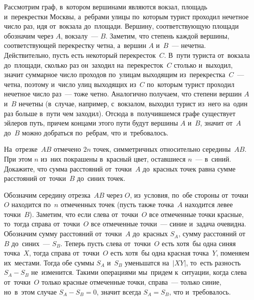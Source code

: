 \ifincludesolutions
Рассмотрим граф, в~котором вершинами являются вокзал, площадь
и~перекрестки Москвы, а~ребрами улицы по~которым турист проходил нечетное число
раз, идя от~вокзала до~площади.
Вершину, соответствующую площади обозначим через $A$, вокзалу~--- $B$.
Заметим, что степень каждой вершины, соответствующей перекрестку четна,
а~вершин $A$ и~$B$~--- нечетна.
Действительно, пусть есть некоторый перекресток~$C$.
В~пути туриста от~вокзала до~площади, сколько раз он~заходил на~перекресток~$C$
столько и~выходил, значит суммарное число проходов по~улицам выходящим
из~перекрестка~$C$~--- четна, поэтому и~число улиц выходящих из~$C$ по~которым
турист проходил нечетное число раз~--- тоже четно.
Аналогично получаем, что степени вершин $A$ и~$B$ нечетны (в~случае, например,
с~вокзалом, выходил турист из~него на~один раз больше в~пути чем заходил).
Отсюда в~получившемся графе существует эйлеров путь, причем концами этого пути
будут вершины $A$ и~$B$, значит от~$A$ до~$B$ можно добраться по~ребрам, что
и~требовалось.
\fi %

\begin{problems}

\item
На~отрезке~$AB$ отмечено $2 n$ точек, симметричных относительно середины~$AB$.
При этом $n$ из~них покрашены в~красный цвет, оставшиеся $n$~--- в~синий.
Докажите, что сумма расстояний от~точки~$A$ до~красных точек равна сумме
расстояний от~точки~$B$ до~синих точек.

\end{problems}

\ifincludesolutions
Обозначим середину отрезка~$AB$ через $O$, из~условия, по~обе
стороны от~точки~$O$ находится по~$n$ отмеченных точек (пусть также точка~$A$
находится левее точки~$B$).
Заметим, что если слева от~точки~$O$ все отмеченные точки красные, то~тогда
справа от~точки~$O$ все отмеченные точки~--- синие и~задача очевидна.
Обозначим сумму расстояний от~точки~$A$ до~красных $S_A$, сумму расстояний
от~$B$ до~синих~--- $S_B$.
Теперь пусть слева от~точки~$O$ есть хотя~бы одна синяя точка~$X$, тогда справа
от~точки~$O$ есть хотя~бы одна красная точка~$Y$, поменяем их~местами.
Тогда обе суммы $S_A$ и~$S_B$ уменьшатся на~$\lvert XY \rvert$, то~есть разность
$S_A - S_B$ не~изменится.
Такими операциями мы~придем к~ситуации, когда слева от~точки~$O$ только красные
отмеченные точки, справа~--- только синие, но~в~этом случае $S_A - S_B = 0$,
значит всегда $S_A = S_B$, что и~требовалось.
\fi %

